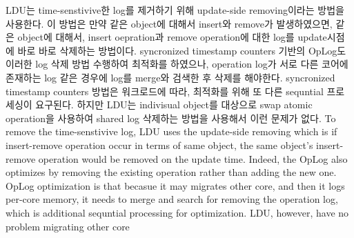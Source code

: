 
\ifkor
LDU는 time-senstivive한 log를 제거하기 위해 update-side removing이라는 방법을 사용한다.
이 방법은 만약 같은 object에 대해서 insert와 remove가 발생하였으면, 같은 object에
대해서, insert oepration과 remove operation에 대한 log를 update시점에 바로 바로 삭제하는 방법이다. 
syncronized timestamp counters 기반의 OpLog도 이러한 log 삭제 방법 수행하여 최적화를 하였으나,
operation log가 서로 다른 코어에 존재하는 log 같은 경우에 log를 merge와 검색한 후 삭제를 해야한다. 
syncronized timestamp counters 방법은 워크로드에 따라, 최적화를 위해 또 다른 sequntial 프로세싱이
요구된다.
하지만 LDU는 indivisual object를 대상으로 swap atomic operation을 사용하여
shared log 삭제하는 방법을 사용해서 이런 문제가 없다.
\else
To remove the time-senstivive log, LDU uses the update-side removing which is if
insert-remove operation occur in terms of same object, the same object's
insert-remove operation would be removed on the update time.
Indeed, the OpLog also optimizes by removing the existing operation rather than
adding the new one.
OpLog optimization is that becasue it may migrates other core, and then it logs
per-core memory, it needs to merge and search for removing the operation log,
which is additional sequntial processing for optimization.
LDU, however, have no problem migrating other core
\fi


